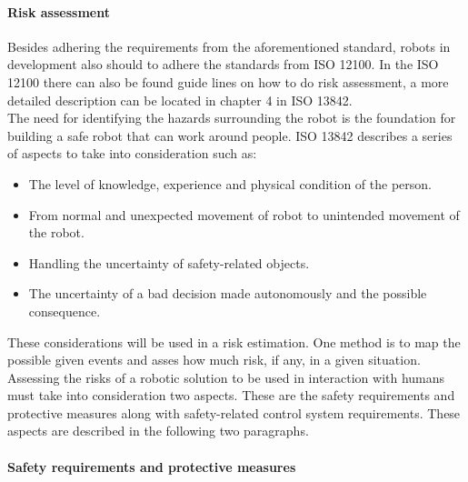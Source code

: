 \paragraph{Risk assessment}\label{secsub:RiskAss}
Besides adhering the requirements from the aforementioned standard, robots in development also should to adhere the standards from ISO 12100. In the ISO 12100 there can also be found guide lines on how to do risk assessment\cite{ISO13842}, a more detailed description can be located in chapter 4 in ISO 13842\cite{ISO13842}.\\
The need for identifying the hazards surrounding the robot is the foundation for building a safe robot that can work around people. ISO 13842 describes a series of aspects to take into consideration such as: 
\begin{itemize}
    \item The level of knowledge, experience and physical
    condition of the person.
    \item From normal and unexpected movement of robot to unintended movement of the robot.
    \item Handling the uncertainty of safety-related objects.
    \item The uncertainty of a bad decision made autonomously and the possible consequence.
\end{itemize}

These considerations will be used in a risk estimation. One method is to map the possible given events and asses how much risk, if any, in a given situation. Assessing the risks of a robotic solution to be used in interaction with humans must take into consideration two aspects. These are the safety requirements and protective measures along with safety-related control system requirements. These aspects are described in the following two paragraphs.

\paragraph{Safety requirements and protective measures}\label{secsub:SafetyReq}

